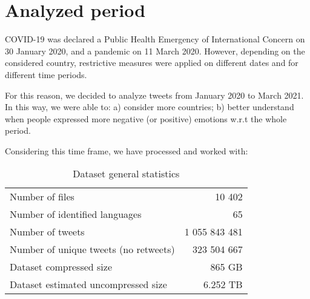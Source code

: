 \section{Analyzed period}
\label{sec:period}
COVID-19 was declared a Public Health Emergency of International Concern on 30 January 2020, and a pandemic on 11 March 2020. However, depending on the considered country, restrictive measures were applied on different dates and for different time periods. 

For this reason, we decided to analyze tweets from January 2020 to March 2021. In this way, we were able to: a) consider more countries; b) better understand when people expressed more negative (or positive) emotions w.r.t the whole period.

Considering this time frame, we have processed and worked with:

\begin{table}[H]
    \centering
    \begin{tabular}{lr}
        Number of files & 10 402
        \\
        Number of identified languages & 65
        \\
        Number of tweets & 1 055 843 481
        \\
        Number of unique tweets (no retweets) & 323 504 667
        \\
        Dataset compressed size & 865 GB
        \\
        Dataset estimated uncompressed size & 6.252 TB
    \end{tabular}
    \caption{Dataset general statistics}
    \label{tab:dataset-stats}
\end{table}

